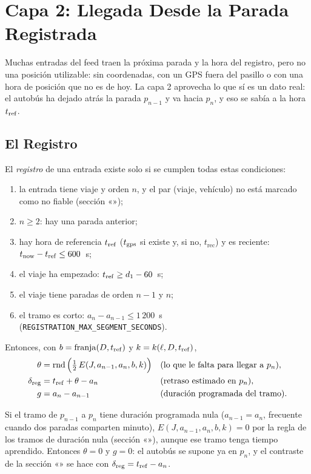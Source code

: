 \section{Capa 2: Llegada Desde la Parada Registrada}
\label{sec:capa2}

Muchas entradas del feed traen la próxima parada y la hora del registro, pero no una posición utilizable: sin
coordenadas, con un GPS fuera del pasillo o con una hora de posición que no es de hoy. La capa 2 aprovecha lo que sí
es un dato real: el autobús ha dejado atrás la parada $p_{n-1}$ y va hacia $p_n$, y eso se sabía a la hora $t_{\mathrm{ref}}$.

\subsection{El Registro}

El \emph{registro} de una entrada existe solo si se cumplen todas estas condiciones:

\begin{enumerate}
  \item la entrada tiene viaje y orden $n$, y el par (viaje, vehículo) no está marcado como no fiable (sección
        «»);
  \item $n\ge2$: hay una parada anterior;
  \item hay hora de referencia $t_{\mathrm{ref}}$ ($t_{\mathrm{gps}}$ si existe y, si no, $t_{\mathrm{rec}}$) y es reciente:
        $t_{\mathrm{now}}-t_{\mathrm{ref}}\le600$~s;
  \item el viaje ha empezado: $t_{\mathrm{ref}}\ge d_1-60$~s;
  \item el viaje tiene paradas de orden $n-1$ y $n$;
  \item el tramo es corto: $a_n-a_{n-1}\le1\,200$~s (\texttt{REGISTRATION\_MAX\_SEGMENT\_SECONDS}).
\end{enumerate}

\noindent Entonces, con $b=\operatorname{franja}(D,t_{\mathrm{ref}})$ y $k=k(\ell,D,t_{\mathrm{ref}})$,
\begin{align}
\label{eq:registro}
\theta&=\operatorname{rnd}\Big(\tfrac12\,E(J,a_{n-1},a_n,b,k)\Big) &&\text{(lo que le falta para llegar a $p_n$)},\\
\delta_{\mathrm{reg}}&=t_{\mathrm{ref}}+\theta-a_n &&\text{(retraso estimado en $p_n$)},\\
g&=a_n-a_{n-1} &&\text{(duración programada del tramo)}.
\end{align}

\noindent Si el tramo de $p_{n-1}$ a $p_n$ tiene duración programada nula ($a_{n-1}=a_n$, frecuente cuando dos paradas
comparten minuto), $E(J,a_{n-1},a_n,b,k)=0$ por la regla de los tramos de duración nula (sección
«»), aunque ese tramo tenga tiempo aprendido. Entonces $\theta=0$ y $g=0$: el autobús se
supone ya en $p_n$, y el contraste de la sección «» se hace con
$\delta_{\mathrm{reg}}=t_{\mathrm{ref}}-a_n$.

